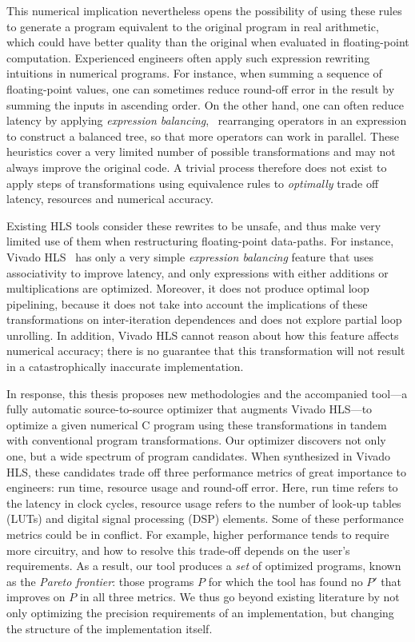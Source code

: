 This numerical implication nevertheless opens the possibility of using these
rules to generate a program equivalent to the original program in real
arithmetic, which could have better quality than the original when evaluated
in floating-point computation.  Experienced engineers often apply such
expression rewriting intuitions in numerical programs.  For instance, when
summing a sequence of floating-point values, one can sometimes reduce round-off
error in the result by summing the inputs in ascending order.  On the other
hand, one can often reduce latency by applying \emph{expression balancing},
\ie~rearranging operators in an expression to construct a balanced tree, so
that more operators can work in parallel.  These heuristics cover a very
limited number of possible transformations and may not always improve the
original code.  A trivial process therefore does not exist to apply steps of
transformations using equivalence rules to \emph{optimally} trade off latency,
resources and numerical accuracy.

Existing HLS tools consider these rewrites to be unsafe, and thus make very
limited use of them when restructuring floating-point data-paths.  For
instance, Vivado HLS~\cite{vivado_hls} has only a very simple \emph{expression
balancing} feature that uses associativity to improve latency, and only
expressions with either additions or multiplications are optimized.  Moreover,
it does not produce optimal loop pipelining, because it does not take
into account the implications of these transformations on inter-iteration
dependences and does not explore partial loop unrolling.  In addition, Vivado
HLS cannot reason about how this feature affects numerical accuracy; there is
no guarantee that this transformation will not result in a catastrophically
inaccurate implementation.

In response, this thesis proposes new methodologies and the accompanied
tool---a fully automatic source-to-source optimizer that augments Vivado
HLS---to optimize a given numerical C program using these transformations in
tandem with conventional program transformations.  Our optimizer discovers
not only one, but a wide spectrum of program candidates.  When synthesized
in Vivado HLS, these candidates trade off three performance metrics of great
importance to engineers: run time, resource usage and round-off error.  Here,
run time refers to the latency in clock cycles, resource usage refers to
the number of look-up tables (LUTs) and digital signal processing (DSP)
elements.  Some of these performance metrics could be in conflict.  For
example, higher performance tends to require more circuitry, and how to
resolve this trade-off depends on the user's requirements.  As a result, our
tool produces a \emph{set} of optimized programs, known as the \emph{Pareto
frontier}: those programs $P$ for which the tool has found no $P'$ that
improves on $P$ in all three metrics.  We thus go beyond existing literature
by not only optimizing the precision requirements of an implementation, but
changing the structure of the implementation itself.

